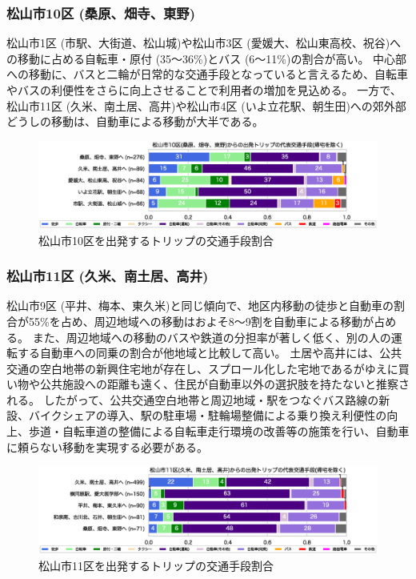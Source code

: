 \documentclass[a4paper,12pt, uplatex]{jsbook}
\begin{document}
\subsubsection{松山市10区 (桑原、畑寺、東野)}
松山市1区 (市駅、大街道、松山城)や松山市3区 (愛媛大、松山東高校、祝谷)への移動に占める自転車・原付 (35〜36\%)とバス (6〜11\%)の割合が高い。
中心部への移動に、バスと二輪が日常的な交通手段となっていると言えるため、自転車やバスの利便性をさらに向上させることで利用者の増加を見込める。
一方で、松山市11区 (久米、南土居、高井)や松山市4区 (いよ立花駅、朝生田)への郊外部どうしの移動は、自動車による移動が大半である。
%
\begin{figure}[H]
    \centering
    \includegraphics[width=1.0\textwidth]{picture/mode_share_松山市10区.eps}
    \caption{松山市10区を出発するトリップの交通手段割合}
    \label{fig:mode_share_10}
\end{figure}

\subsubsection{松山市11区 (久米、南土居、高井)}
松山市9区 (平井、梅本、東久米)と同じ傾向で、地区内移動の徒歩と自動車の割合が55\%を占め、周辺地域への移動はおよそ8〜9割を自動車による移動が占める。
また、周辺地域への移動のバスや鉄道の分担率が著しく低く、別の人の運転する自動車への同乗の割合が他地域と比較して高い。
土居や高井には、公共交通の空白地帯の新興住宅地が存在し、スプロール化した宅地であるがゆえに買い物や公共施設への距離も遠く、住民が自動車以外の選択肢を持たないと推察される。
したがって、公共交通空白地帯と周辺地域・駅をつなぐバス路線の新設、バイクシェアの導入、駅の駐車場・駐輪場整備による乗り換え利便性の向上、歩道・自転車道の整備による自転車走行環境の改善等の施策を行い、自動車に頼らない移動を実現する必要がある。
%
\begin{figure}[H]
    \centering
    \includegraphics[width=1.0\textwidth]{picture/mode_share_松山市11区.eps}
    \caption{松山市11区を出発するトリップの交通手段割合}
    \label{fig:mode_share_11}
\end{figure}
\end{document}
